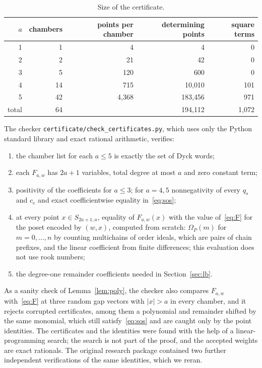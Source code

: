 \documentclass[11pt]{article}
\theoremstyle{definition}
\theoremstyle{remark}
\begin{document}
\begin{table}[h]
\centering
\begin{tabular}{rrrrr}
\toprule
$a$ & chambers & points per chamber & determining points & square terms\\
\midrule
1 & 1 & 4 & 4 & 0\\
2 & 2 & 21 & 42 & 0\\
3 & 5 & 120 & 600 & 0\\
4 & 14 & 715 & 10{,}010 & 101\\
5 & 42 & 4{,}368 & 183{,}456 & 971\\
\midrule
total & 64 & & 194{,}112 & 1{,}072\\
\bottomrule
\end{tabular}
\caption{Size of the certificate.}\label{tab:cert}
\end{table}

The checker \texttt{certificate/check\_certificates.py}, which uses only
the Python standard library and exact rational arithmetic, verifies:
\begin{enumerate}
\item the chamber list for each $a\le5$ is exactly the set of Dyck words;
\item each $F_{a,w}$ has $2a+1$ variables, total degree at most $a$ and
zero constant term;
\item positivity of the coefficients for $a\le3$; for $a=4,5$
nonnegativity of every $q_s$ and $c_e$ and exact coefficientwise
equality in~\eqref{eq:sos};
\item at every point $x\in S_{2a+1,a}$, equality of $F_{a,w}(x)$ with the
value of~\eqref{eq:F} for the poset encoded by $(w,x)$, computed from
scratch: $\Omega_P(m)$ for $m=0,\dots,n$ by counting multichains of
order ideals, which are pairs of chain prefixes, and the linear
coefficient from finite differences; this evaluation does not use rook
numbers;
\item the degree-one remainder coefficients needed in
Section~\ref{sec:lb}.
\end{enumerate}
As a sanity check of Lemma~\ref{lem:poly}, the checker also compares
$F_{a,w}$ with~\eqref{eq:F} at three random gap vectors with $|x|>a$ in
every chamber, and it rejects corrupted certificates, among them a
polynomial and remainder shifted by the same monomial, which still
satisfy~\eqref{eq:sos} and are caught only by the point identities. The certificates and the identities were found
with the help of a linear-programming search; the search is not part of
the proof, and the accepted weights are exact rationals. The original
research package contained two further independent verifications of the
same identities, which we reran.
\end{document}
